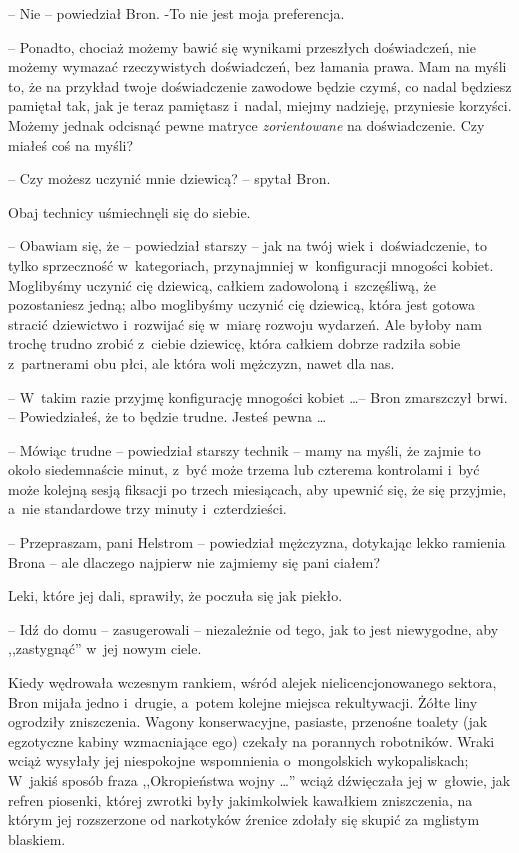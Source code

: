 \documentclass[oneside,polish,11pt,rmheadings]{mwbk}
\begin{document}
-- Nie -- powiedział Bron. -To nie jest moja preferencja. 

-- Ponadto, chociaż możemy bawić się wynikami przeszłych doświadczeń, nie możemy wymazać rzeczywistych doświadczeń, bez łamania prawa. Mam na myśli to, że na przykład twoje doświadczenie zawodowe będzie czymś, co nadal będziesz pamiętał tak, jak je teraz pamiętasz i~nadal, miejmy nadzieję, przyniesie korzyści. Możemy jednak odcisnąć pewne matryce  \textit{zorientowane }na doświadczenie. Czy miałeś coś na myśli? 

-- Czy możesz uczynić mnie dziewicą? -- spytał Bron. 

Obaj technicy uśmiechnęli się do siebie. 

-- Obawiam się, że -- powiedział starszy -- jak na twój wiek i~doświadczenie, to tylko sprzeczność w~kategoriach, przynajmniej w~konfiguracji mnogości kobiet. Moglibyśmy uczynić cię dziewicą, całkiem zadowoloną i~szczęśliwą, że pozostaniesz jedną; albo moglibyśmy uczynić cię dziewicą, która jest gotowa stracić dziewictwo i~rozwijać się w~miarę rozwoju wydarzeń. Ale byłoby nam trochę trudno zrobić z~ciebie dziewicę, która całkiem dobrze radziła sobie z~partnerami obu płci, ale która woli mężczyzn, nawet dla nas. 

-- W~takim razie przyjmę konfigurację mnogości kobiet \ldots  -- Bron zmarszczył brwi. -- Powiedziałeś, że to będzie trudne. Jesteś pewna \ldots  

-- Mówiąc trudne -- powiedział starszy technik -- mamy na myśli, że zajmie to około siedemnaście minut, z~być może trzema lub czterema kontrolami i~być może kolejną sesją fiksacji po trzech miesiącach, aby upewnić się, że się przyjmie, a~nie standardowe trzy minuty i~czterdzieści. 

-- Przepraszam, pani Helstrom -- powiedział mężczyzna, dotykając lekko ramienia Brona -- ale dlaczego najpierw nie zajmiemy się pani ciałem? 

Leki, które jej dali, sprawiły, że poczuła się jak piekło. 

-- Idź do domu -- zasugerowali -- niezależnie od tego, jak to jest niewygodne, aby ,,zastygnąć'' w~jej nowym ciele. 

Kiedy wędrowała wczesnym rankiem, wśród alejek nielicencjonowanego sektora, Bron mijała jedno i~drugie, a~potem kolejne miejsca rekultywacji. Żółte liny ogrodziły zniszczenia. Wagony konserwacyjne, pasiaste, przenośne toalety (jak egzotyczne kabiny wzmacniające ego) czekały na porannych robotników. Wraki wciąż wysyłały jej niespokojne wspomnienia o~mongolskich wykopaliskach; W~jakiś sposób fraza ,,Okropieństwa wojny \ldots '' wciąż dźwięczała jej w~głowie, jak refren piosenki, której zwrotki były jakimkolwiek kawałkiem zniszczenia, na którym jej rozszerzone od narkotyków źrenice zdołały się skupić za mglistym blaskiem. 
\end{document}
